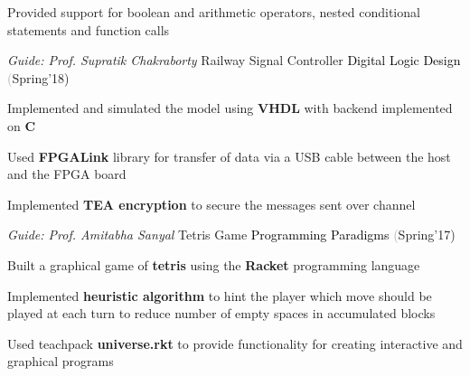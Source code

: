 \begin{cventries}
{\begin{cvitems}
        \item Provided support for boolean and arithmetic operators, nested conditional statements and function calls \vspace{-1mm}
      \end{cvitems}
    }
  \cventry
    {\textit{Guide: Prof. Supratik Chakraborty}}
    {Railway Signal Controller}
    {\textcolor{black} {Digital Logic Design}}
    {\fontsize{9pt}{1em} \textcolor{darkgray}(Spring'18)}
    {
      \begin{cvitems}
        \item Implemented and simulated the model using \textbf{VHDL} with backend implemented on \textbf{C} \vspace{0.25mm}
        \item Used \textbf{FPGALink} library for transfer of data via a USB cable between the host and the FPGA board \vspace{0.25mm}
        \item Implemented \textbf{TEA encryption} to secure the messages sent over channel  \vspace{-1mm}
      \end{cvitems}
    }
  \cventry
    {\textit{Guide: Prof. Amitabha Sanyal}}
    {Tetris Game}
    {\textcolor{black} {Programming Paradigms}}
    {\fontsize{9pt}{1em} \textcolor{darkgray}(Spring'17)}
    {
      \begin{cvitems}
        \item Built a graphical game of \textbf{tetris} using the \textbf{Racket} programming language \vspace{0.25mm}
        \item Implemented \textbf{heuristic algorithm} to hint the player which move should be played at each turn to reduce
        number of empty spaces in accumulated blocks \vspace{0.25mm}
        \item Used teachpack \textbf{universe.rkt} to provide functionality for creating interactive and graphical programs \vspace{-1mm}
      \end{cvitems}
    }
  

\end{cventries}